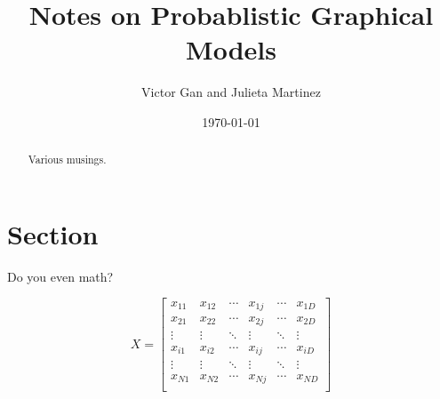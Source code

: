 \documentclass[12pt]{article}
\title{\sffamily\bfseries Notes on Probablistic Graphical Models}
\author{Victor Gan and Julieta Martinez}
\date{\today}
\begin{document}

\maketitle

\begin{abstract}
Various musings.
\end{abstract}

\section{Section}
Do you even math?

$$ X = 
\begin{bmatrix}
x_{11} &  x_{12} & \dotsm &  x_{1j} & \dotsm & x_{1D} \\
x_{21} &  x_{22} & \dotsm &  x_{2j} & \dotsm & x_{2D} \\
\vdots &  \vdots & \ddots &  \vdots & \ddots & \vdots \\
x_{i1} &  x_{i2} & \dotsm &  x_{ij} & \dotsm & x_{iD} \\
\vdots &  \vdots & \ddots &  \vdots & \ddots & \vdots \\
x_{N1} &  x_{N2} & \dotsm &  x_{Nj} & \dotsm & x_{ND} \\
\end{bmatrix} 
$$




\end{document}
